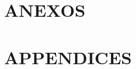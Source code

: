 











\singlespacing
%


\cleardoublepage %


%

%





\appendix
\ifspanish
	\part*{\sffamily ANEXOS}
\else
	\part*{\sffamily APPENDICES}
\fi

